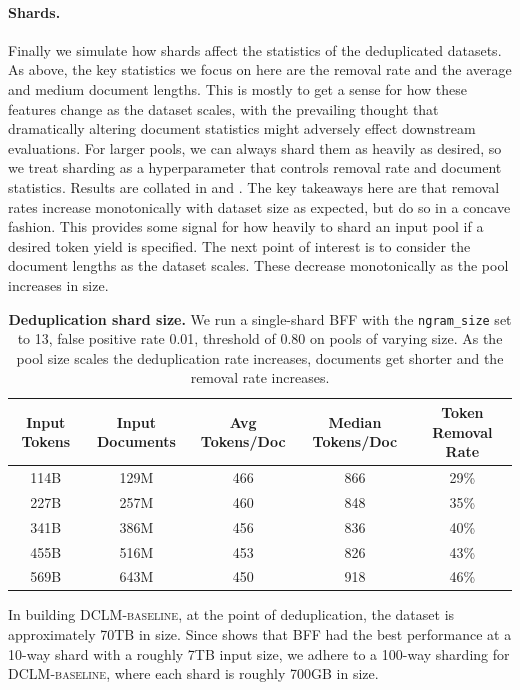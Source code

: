 \documentclass{article}
\newcommand{\hqpool}{\textsc{DCLM-baseline}\xspace}
\begin{document}
\paragraph{Shards.}
Finally we simulate how shards affect the statistics of the deduplicated datasets. As above, the key statistics we focus on here are the removal rate and the average and medium document lengths. This is mostly to get a sense for how these features change as the dataset scales, with the prevailing thought that dramatically altering document statistics might adversely effect downstream evaluations. For larger pools, we can always shard them as heavily as desired, so we treat sharding as a hyperparameter that controls removal rate and document statistics. Results are collated in  and .
The key takeaways here are that removal rates increase monotonically with dataset size as expected, but do so in a concave fashion. This provides some signal for how heavily to shard an input pool if a desired token yield is specified. The next point of interest is to consider the document lengths as the dataset scales. These decrease monotonically as the pool increases in size.

\begin{table}[t]
\centering
\small
\caption{\textbf{Deduplication shard size.} We run a single-shard BFF with the \texttt{ngram\_size} set to 13, false positive rate 0.01, threshold of 0.80 on pools of varying size. As the pool size scales the deduplication rate increases, documents get shorter and the removal rate increases.}
\label{table:dedup-ablations-scale}
\begin{tabular}{cc|ccc}
\toprule
Input Tokens & Input Documents & Avg Tokens/Doc & Median Tokens/Doc & Token Removal Rate  \\
\midrule
114B & 129M & 466 & 866 & 29\% \\
227B & 257M & 460 & 848 & 35\% \\
341B & 386M & 456 & 836 & 40\% \\
455B & 516M & 453 & 826 & 43\% \\
569B & 643M & 450 & 918 & 46\%  \\
\bottomrule
\end{tabular}
%
\end{table}


In building \hqpool, at the point of deduplication, the dataset is approximately 70TB in size. Since  shows that BFF had the best performance at a 10-way shard with a roughly 7TB input size, we adhere to a 100-way sharding for \hqpool, where each shard is roughly 700GB in size.
\end{document}
